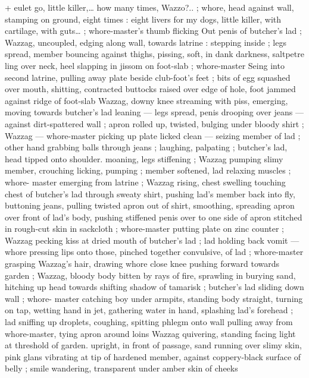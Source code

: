 + eulet go, little killer,{\ldots} how many times, Wazzo?..{\gr} ; whore, head 
against wall, stamping on ground, eight times :{\td} {\gl} eight livers for my 
dogs, little killer, with cartilage, with guts{\ldots} {\gr} ; whore-master's thumb 
flicking Out penis of butcher's lad ; Wazzag, uncoupled, edging along 
wall, towards latrine : stepping inside ; legs spread, member 
bouncing against thighs, pissing, soft, in dank darkness, saltpetre 
ling over neck, heel slapping in jissom on foot-slab ; whore-master 
Seing into second latrine, pulling away plate beside club-foot's feet 
; bits of egg squashed over mouth, shitting, contracted buttocks 
raised over edge of hole, foot jammed against ridge of foot-slab 
Wazzag, downy knee streaming with piss, emerging, moving towards 
butcher's lad leaning --- legs spread, penis drooping over jeans --- 
against dirt-spattered wall ; apron rolled up, twisted, bulging under 
bloody shirt ; Wazzag --- whore-master picking up plate licked clean 
--- seizing member of lad ; other hand grabbing balls through jeans 
; laughing, palpating ; butcher's lad, head tipped onto shoulder. 
moaning, legs stiffening ; Wazzag pumping slimy member, crouching 
licking, pumping ; member softened, lad relaxing muscles ; whore- 
master emerging from latrine ; Wazzag rising, chest swelling 
touching chest of butcher's lad through sweaty shirt, pushing lad's 
member back into fly, buttoning jeans, pulling twisted apron out of 
shirt, smoothing, spreading apron over front of lad's body, pushing 
stiffened penis over to one side of apron stitched in rough-cut skin 
in sackcloth ; whore-master putting plate on zinc counter ; Wazzag 
pecking kiss at dried mouth of butcher's lad ; lad holding back vomit 
--- whore pressing lips onto those, pinched together convulsive, of 
lad ; whore-master grasping Wazzag's hair, drawing whore close 
knee pushing forward towards garden ; Wazzag, bloody body bitten 
by rays of fire, sprawling in burying sand, hitching up head towards 
shifting shadow of tamarisk ; butcher's lad sliding down wall ; whore- 
master catching boy under armpits, standing body straight, turning 
on tap, wetting hand in jet, gathering water in hand, splashing lad's 
forehead ; lad sniffing up droplets, coughing, spitting phlegm onto 
wall pulling away from whore-master, tying apron around loins 
Wazzag quivering, standing facing light at threshold of garden. 
upright, in front of passage, sand running over slimy skin, pink glans 
vibrating at tip of hardened member, against coppery-black surface 
of belly ; smile wandering, transparent under amber skin of cheeks 
